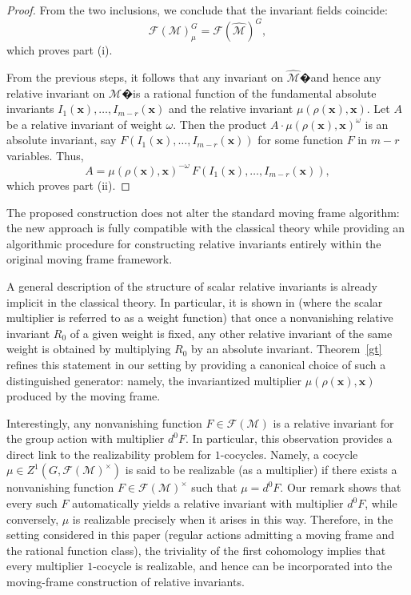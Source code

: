 \documentclass[12pt,reqno]{amsart}
\begin{document}
\begin{proof}
From the two inclusions, we conclude that the invariant fields coincide:
$$
\mathcal F(\mathcal M)^G_\mu = \mathcal F(\widehat{\mathcal M})^G,
$$
which proves part (i).

\medskip

From the previous steps, it follows that any invariant on $\widehat{\mathcal M}$�and hence any relative
invariant on $\mathcal M$�is a rational function of the fundamental absolute invariants
$I_1(\boldsymbol x), \dots, I_{m-r}(\boldsymbol x)$ and the relative invariant
$\mu(\rho(\boldsymbol x), \boldsymbol x)$.
Let $A$ be a relative invariant of weight $\omega$. Then the product
$A \cdot \mu(\rho(\boldsymbol x), \boldsymbol x)^{\omega}$ is an absolute invariant,
say $F(I_1(\boldsymbol x), \dots, I_{m-r}(\boldsymbol x))$ for some function $F$ in $m - r$ variables.
Thus,
$$
A = \mu(\rho(\boldsymbol x), \boldsymbol x)^{-\omega}
\, F(I_1(\boldsymbol x), \dots, I_{m-r}(\boldsymbol x)),
$$
which proves part (ii).
\end{proof}

\medskip

The proposed construction does not alter the standard moving frame algorithm:
the new approach is fully compatible with the classical theory while providing an
{algorithmic} procedure for constructing relative invariants entirely within the
original moving frame framework.

\medskip

A general description of the structure of scalar relative invariants is already implicit in the
classical theory. In particular, it is shown in \cite{Olver1995} (where the scalar multiplier is
referred to as a {weight function}) that once a nonvanishing relative invariant \(R_0\) of a given
weight is fixed, any other relative invariant of the same weight is obtained by multiplying \(R_0\)
by an absolute invariant. Theorem~\ref{gt} refines this statement in our setting by providing a
canonical choice of such a distinguished generator: namely, the invariantized multiplier
\(\mu(\rho(\boldsymbol x),\boldsymbol x)\) produced by the moving frame.

\medskip

Interestingly, any nonvanishing function $F \in \mathcal F(\mathcal M)$ is a relative invariant
for the group action with multiplier $d^0 F$.
In particular, this observation provides a direct link to the realizability problem for
\(1\)-cocycles. Namely, a cocycle \(\mu\in Z^{1}(G,\mathcal F(\mathcal M)^\times)\) is said to be realizable
(as a multiplier) if there exists a nonvanishing function \(F\in\mathcal F(\mathcal M)^\times\) such that
\(\mu=d^{0}F\).
Our remark shows that every such \(F\) automatically yields a relative invariant 
with multiplier \(d^{0}F\), while conversely, \(\mu\) is realizable precisely when it arises in this way.
Therefore, in the setting considered in this paper (regular actions admitting a moving frame and the
rational function class), the triviality of the first cohomology implies that {every} multiplier
\(1\)-cocycle is realizable, and hence can be incorporated into the moving-frame construction of relative
invariants.
\end{document}
